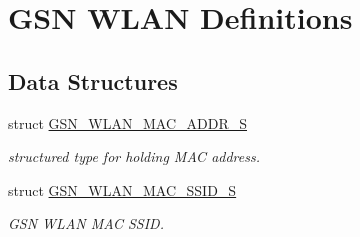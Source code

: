 \hypertarget{a00641}{
\section{GSN WLAN Definitions}
\label{a00641}
}
\subsection*{Data Structures}
\begin{DoxyCompactItemize}
\item 
struct \hyperlink{a00416}{GSN\_\-WLAN\_\-MAC\_\-ADDR\_\-S}
\begin{DoxyCompactList}\small\item\em structured type for holding MAC address. \end{DoxyCompactList}\item 
struct \hyperlink{a00417}{GSN\_\-WLAN\_\-MAC\_\-SSID\_\-S}
\begin{DoxyCompactList}\small\item\em GSN WLAN MAC SSID. \end{DoxyCompactList}\end{DoxyCompactItemize}

